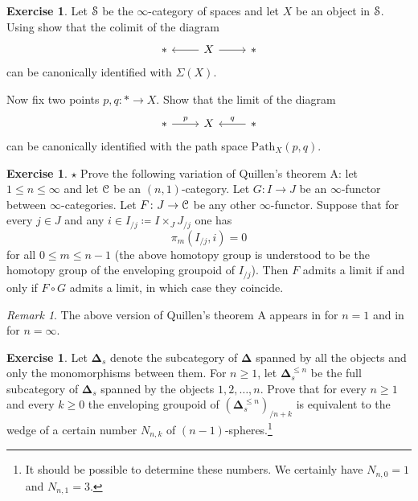 \documentclass[10pt,a4paper,reqno,oneside]{book} %
\theoremstyle{plain}
\theoremstyle{definition}
\newtheorem{exercise}[thm]{Exercise}
\theoremstyle{remark}
\newtheorem{rem}[thm]{Remark}
\numberwithin{equation}{section}
\begin{document}
\begin{exercise}
	Let $\mathcal S$ be the $\infty$-category of spaces and let $X$ be an object in $\mathcal S$.
	Using \cite[Theorem 4.2.4.1]{HTT} show that the colimit of the diagram
	\[ \begin{tikzcd}
		* & X \arrow{l} \arrow{r} & *
	\end{tikzcd} \]
	can be canonically identified with $\Sigma(X)$.
	
	Now fix two points $p, q \colon * \to X$. Show that the limit of the diagram
	\[ \begin{tikzcd}
		* \arrow{r}{p} & X & * \arrow{l}[swap]{q}
	\end{tikzcd} \]
	can be canonically identified with the path space $\mathrm{Path}_X(p,q)$.
\end{exercise}

\begin{exercise}
	$\star$ Prove the following variation of Quillen's theorem A: let $1 \le n \le \infty$ and let $\mathcal C$ be an $(n,1)$-category.
	Let $G \colon I \to J$ be an $\infty$-functor between $\infty$-categories.
	Let $F \colon J \to \mathcal C$ be any other $\infty$-functor.
	Suppose that for every $j \in J$ and any $i \in I_{/j} \coloneqq I \times_J J_{/j}$ one has
	\[ \pi_m( I_{/j}, i ) = 0 \]
	for all $0 \le m \le n-1$ (the above homotopy group is understood to be the homotopy group of the enveloping groupoid of $I_{/j}$).
	Then $F$ admits a limit if and only if $F \circ G$ admits a limit, in which case they coincide.
\end{exercise}

\begin{rem}
	The above version of Quillen's theorem A appears in \cite{MacLane_Categories} for $n = 1$ and in \cite[4.1.3.1]{HTT} for $n = \infty$.
\end{rem}

\begin{exercise}
	Let $\mathbf \Delta_s$ denote the subcategory of $\mathbf \Delta$ spanned by all the objects and only the monomorphisms between them.
	For $n \ge 1$, let $\mathbf \Delta^{\le n}_s$ be the full subcategory of $\mathbf \Delta_s$ spanned by the objects $1, 2, \ldots, n$.
	Prove that for every $n \ge 1$ and every $k \ge 0$ the enveloping groupoid of $(\mathbf \Delta^{\le n}_s)_{/n+k}$ is equivalent to the wedge of a certain number $N_{n,k}$ of $(n-1)$-spheres.\footnote{It should be possible to determine these numbers. We certainly have $N_{n,0} = 1$ and $N_{n,1} = 3$.}
\end{exercise}
\end{document}
